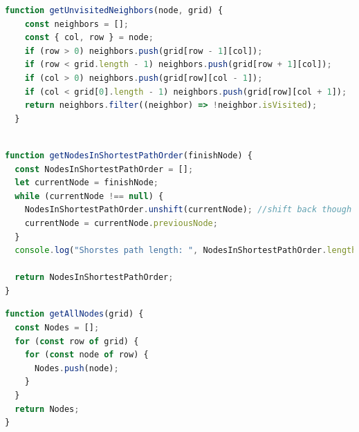 \documentclass[12pt]{article}
\begin{document}
\begin{lstlisting}[language=JavaScript, caption=Kode for at søge nye nodes]
  function getUnvisitedNeighbors(node, grid) {
    const neighbors = [];
    const { col, row } = node;
    if (row > 0) neighbors.push(grid[row - 1][col]);
    if (row < grid.length - 1) neighbors.push(grid[row + 1][col]);
    if (col > 0) neighbors.push(grid[row][col - 1]);
    if (col < grid[0].length - 1) neighbors.push(grid[row][col + 1]);
    return neighbors.filter((neighbor) => !neighbor.isVisited);
  }
  
\end{lstlisting}
\begin{lstlisting}[language=JavaScript, caption=Kode for finde korteste vej]
  function getNodesInShortestPathOrder(finishNode) {
  const NodesInShortestPathOrder = [];
  let currentNode = finishNode;
  while (currentNode !== null) {
    NodesInShortestPathOrder.unshift(currentNode); //shift back though finishNode
    currentNode = currentNode.previousNode;
  }
  console.log("Shorstes path length: ", NodesInShortestPathOrder.length);

  return NodesInShortestPathOrder;
}
\end{lstlisting}
\begin{lstlisting}[language=JavaScript, caption=Kode for finde alle nodes i grid, label={lst:getAllNodes}]
function getAllNodes(grid) {
  const Nodes = [];
  for (const row of grid) {
    for (const node of row) {
      Nodes.push(node);
    }
  }
  return Nodes;
}
\end{lstlisting}

\end{document}
